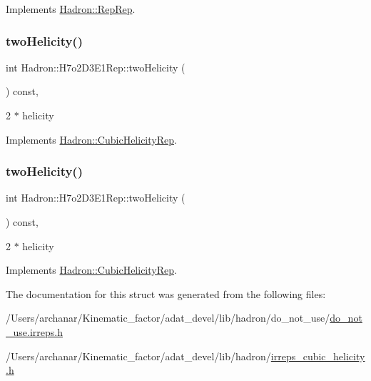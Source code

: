 Implements \mbox{\hyperlink{structHadron_1_1RepRep_ab3213025f6de249f7095892109575fde}{Hadron\+::\+Rep\+Rep}}.

\mbox{\label{structHadron_1_1H7o2D3E1Rep_af472ee043f8e74621c8a32fb43e30b5f}} 
\subsubsection{\texorpdfstring{twoHelicity()}{twoHelicity()}\hspace{0.1cm}{\footnotesize\ttfamily [1/2]}}
{\footnotesize\ttfamily int Hadron\+::\+H7o2\+D3\+E1\+Rep\+::two\+Helicity (\begin{DoxyParamCaption}{ }\end{DoxyParamCaption}) const\hspace{0.3cm}{\ttfamily [inline]}, {\ttfamily [virtual]}}

2 $\ast$ helicity 

Implements \mbox{\hyperlink{structHadron_1_1CubicHelicityRep_af507aa56fc2747eacc8cb6c96db31ecc}{Hadron\+::\+Cubic\+Helicity\+Rep}}.

\mbox{\label{structHadron_1_1H7o2D3E1Rep_af472ee043f8e74621c8a32fb43e30b5f}} 
\subsubsection{\texorpdfstring{twoHelicity()}{twoHelicity()}\hspace{0.1cm}{\footnotesize\ttfamily [2/2]}}
{\footnotesize\ttfamily int Hadron\+::\+H7o2\+D3\+E1\+Rep\+::two\+Helicity (\begin{DoxyParamCaption}{ }\end{DoxyParamCaption}) const\hspace{0.3cm}{\ttfamily [inline]}, {\ttfamily [virtual]}}

2 $\ast$ helicity 

Implements \mbox{\hyperlink{structHadron_1_1CubicHelicityRep_af507aa56fc2747eacc8cb6c96db31ecc}{Hadron\+::\+Cubic\+Helicity\+Rep}}.



The documentation for this struct was generated from the following files\+:\begin{DoxyCompactItemize}
\item 
/\+Users/archanar/\+Kinematic\+\_\+factor/adat\+\_\+devel/lib/hadron/do\+\_\+not\+\_\+use/\mbox{\hyperlink{do__not__use_8irreps_8h}{do\+\_\+not\+\_\+use.\+irreps.\+h}}\item 
/\+Users/archanar/\+Kinematic\+\_\+factor/adat\+\_\+devel/lib/hadron/\mbox{\hyperlink{lib_2hadron_2irreps__cubic__helicity_8h}{irreps\+\_\+cubic\+\_\+helicity.\+h}}\end{DoxyCompactItemize}
